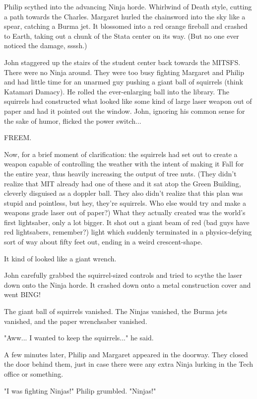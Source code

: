 \documentclass[10pt]{article}
\begin{document}
Philip scythed into the advancing Ninja horde. Whirlwind of Death style, cutting a path towards the Charles. Margaret hurled the chainsword into the sky like a spear, catching a Burma jet. It blossomed into a red orange fireball and crashed to Earth, taking out a chunk of the Stata center on its way. (But no one ever noticed the damage, ssssh.)

John staggered up the stairs of the student center back towards the MITSFS. There were no Ninja around. They were too busy fighting Margaret and Philip and had little time for an unarmed guy pushing a giant ball of squirrels (think Katamari Damacy). He rolled the ever-enlarging ball into the library. The squirrels had constructed what looked like some kind of large laser weapon out of paper and had it pointed out the window. John, ignoring his common sense for the sake of humor, flicked the power switch...

FREEM.

Now, for a brief moment of clarification: the squirrels had set out to create a weapon capable of controlling the weather with the intent of making it Fall for the entire year, thus heavily increasing the output of tree nuts. (They didn't realize that MIT already had one of these and it sat atop the Green Building, cleverly disguised as a doppler ball. They also didn't realize that this plan was stupid and pointless, but hey, they're squirrels. Who else would try and make a weapons grade laser out of paper?) What they actually created was the world's first lightsaber, only a lot bigger. It shot out a giant beam of red (bad guys have red lightsabers, remember?) light which suddenly terminated in a physics-defying sort of way about fifty feet out, ending in a weird crescent-shape.

It kind of looked like a giant wrench.

John carefully grabbed the squirrel-sized controls and tried to scythe the laser down onto the Ninja horde. It crashed down onto a metal construction cover and went BING!

The giant ball of squirrels vanished. The Ninjas vanished, the Burma jets vanished, and the paper wrenchsaber vanished.

"Aww... I wanted to keep the squirrels..." he said.

A few minutes later, Philip and Margaret appeared in the doorway. They closed the door behind them, just in case there were any extra Ninja lurking in the Tech office or something.

"I was fighting Ninjas!" Philip grumbled. "Ninjas!"
\end{document}
